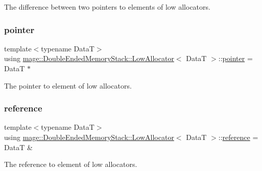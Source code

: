 The difference between two pointers to elements of low allocators. \hypertarget{structmage_1_1_double_ended_memory_stack_1_1_low_allocator_a1b1b80faf9e5a34f5ee35979a78f68a7}{}\label{structmage_1_1_double_ended_memory_stack_1_1_low_allocator_a1b1b80faf9e5a34f5ee35979a78f68a7} 
\subsubsection{\texorpdfstring{pointer}{pointer}}
{\footnotesize\ttfamily template$<$typename DataT$>$ \\
using \hyperlink{structmage_1_1_double_ended_memory_stack_1_1_low_allocator}{mage\+::\+Double\+Ended\+Memory\+Stack\+::\+Low\+Allocator}$<$ DataT $>$\+::\hyperlink{structmage_1_1_double_ended_memory_stack_1_1_low_allocator_a1b1b80faf9e5a34f5ee35979a78f68a7}{pointer} =  DataT $\ast$}

The pointer to element of low allocators. \hypertarget{structmage_1_1_double_ended_memory_stack_1_1_low_allocator_a0d6e290bc4fa4cc0d8595a8eadf21508}{}\label{structmage_1_1_double_ended_memory_stack_1_1_low_allocator_a0d6e290bc4fa4cc0d8595a8eadf21508} 
\subsubsection{\texorpdfstring{reference}{reference}}
{\footnotesize\ttfamily template$<$typename DataT$>$ \\
using \hyperlink{structmage_1_1_double_ended_memory_stack_1_1_low_allocator}{mage\+::\+Double\+Ended\+Memory\+Stack\+::\+Low\+Allocator}$<$ DataT $>$\+::\hyperlink{structmage_1_1_double_ended_memory_stack_1_1_low_allocator_a0d6e290bc4fa4cc0d8595a8eadf21508}{reference} =  DataT \&}

The reference to element of low allocators. \hypertarget{structmage_1_1_double_ended_memory_stack_1_1_low_allocator_ad59f0cf4da8f47289493179d9236e342}{}\label{structmage_1_1_double_ended_memory_stack_1_1_low_allocator_ad59f0cf4da8f47289493179d9236e342} 

